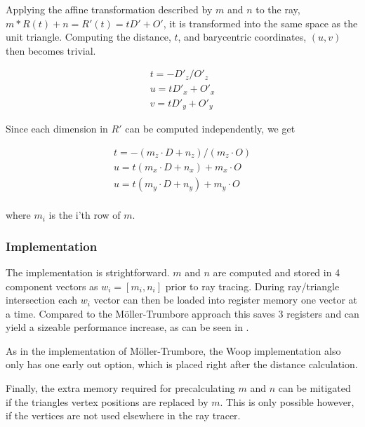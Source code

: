 Applying the affine transformation described by $m$ and $n$ to the
ray, $m * R(t) + n = R'(t) = tD' + O'$, it is transformed into the
same space as the unit triangle. Computing the distance, $t$, and
barycentric coordinates, $(u,v)$ then becomes trivial.

\begin{displaymath}
  \begin{array}{l}
    t = - D'_z / O'_z \\
    u = t D'_x + O'_x \\
    v = t D'_y + O'_y
  \end{array}
\end{displaymath}

Since each dimension in $R'$ can be computed independently, we get 

\begin{displaymath}
  \begin{array}{l}
    t = - (m_z \cdot D + n_z) / (m_z \cdot O) \\
    u = t (m_x \cdot D + n_x) + m_x \cdot O \\
    u = t (m_y \cdot D + n_y) + m_y \cdot O \\
  \end{array}
\end{displaymath}

where $m_i$ is the i'th row of $m$.

\subsubsection{Implementation}

The implementation is strightforward. $m$ and $n$ are computed and stored in 4
component vectors as $w_i = \left[m_i, n_i \right]$ prior to ray tracing. During
ray/triangle intersection each $w_i$ vector can then be loaded into register
memory one vector at a time. Compared to the Möller-Trumbore approach this saves
3 registers and can yield a sizeable performance increase, as can be seen in
.


As in the implementation of Möller-Trumbore, the Woop implementation also only
has one early out option, which is placed right after the distance calculation.


Finally, the extra memory required for precalculating $m$ and $n$ can be
mitigated if the triangles vertex positions are replaced by $m$. This is only
possible however, if the vertices are not used elsewhere in the ray tracer.

